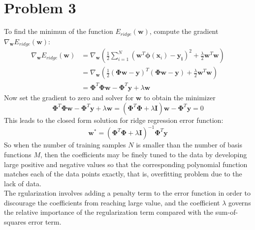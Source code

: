 \documentclass{article}
\begin{document}
\section*{Problem 3}
To find the minimun of the function $E_{ridge}(\bm{w})$, compute the gradient $\nabla_{\bm{w}}E_{ridge}(\bm{w})$:
\begin{equation}
\begin{aligned}
\nabla_{\bm{w}}E_{ridge}(\bm{w})
&= \nabla_{\bm{w}}( \frac{1}{2}\sum_{i=1}^{N}(\bm{w}^T\bm{\phi}(\bm{x}_i) - \bm{y_i})^2+\frac{\lambda}{2}\bm{w}^T\bm{w})\\
&= \nabla_{\bm{w}}(\frac{1}{2}(\bm{\Phi}\bm{w}-\bm{y})^T(\bm{\Phi}\bm{w}-\bm{y})+\frac{\lambda}{2}\bm{w}^T\bm{w})\\
&= \bm{\Phi}^T\bm{\Phi w}-\bm{\Phi}^T\bm{y} + \lambda \bm{w}
\end{aligned}
\end{equation}
Now set the gradient to zero and solver for $\bm{w}$ to obtain the minimizer
\begin{equation}
\bm{\Phi}^T\bm{\Phi w}-\bm{\Phi}^T\bm{y} + \lambda \bm{w} = (\bm{\Phi}^T\bm{\Phi}+\lambda \bm{I}) \bm{w} - \bm{\Phi}^T\bm{y} = 0
\end{equation}
This leads to the closed form solution for ridge regression error function:
\begin{equation}
\bm{w}^* = (\bm{\Phi}^T\bm{\Phi}+\lambda \bm{I})^{-1}\bm{\Phi}^T\bm{y}
\end{equation}
So when the number of training samples $N$ is smaller than the number of basis functions $M$, then the coefficients may be finely tuned to the data by developing large positive and negative values so that the corresponding polynomial function matches each of the data points exactly, that is, overfitting problem due to the lack of data.\\
The rgularization involves adding a penalty term to the error function in order to discourage the coefficients from reaching large value, and the coefficient $\lambda$ governs the relative importance of the regularization term compared with the sum-of-squares error term.
\end{document}
